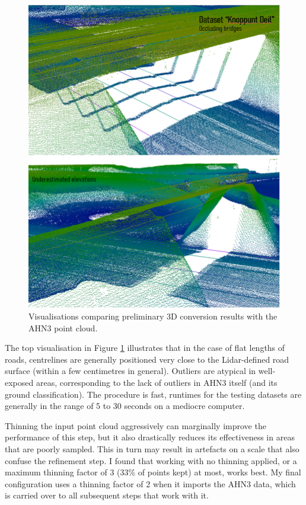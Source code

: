 \begin{figure}
    \centering
    \includegraphics[width=0.9\linewidth]{final_report/figs/elevationestimation2.png}
    \caption{Visualisations comparing preliminary 3D conversion results with the AHN3 point cloud.}
    \label{fig:elevationestimation2}
\end{figure}

The top visualisation in Figure \ref{fig:elevationestimation2} illustrates that in the case of flat lengths of roads, centrelines are generally positioned very close to the Lidar-defined road surface (within a few centimetres in general). Outliers are atypical in well-exposed areas, corresponding to the lack of outliers in AHN3 itself (and its ground classification). The procedure is fast, runtimes for the testing datasets are generally in the range of 5 to 30 seconds on a mediocre computer.

Thinning the input point cloud aggressively can marginally improve the performance of this step, but it also drastically reduces its effectiveness in areas that are poorly sampled. This in turn may result in artefacts on a scale that also confuse the refinement step. I found that working with no thinning applied, or a maximum thinning factor of 3 (33\% of points kept) at most, works best. My final configuration uses a thinning factor of 2 when it imports the AHN3 data, which is carried over to all subsequent steps that work with it.

